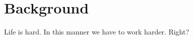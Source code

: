 \documentclass{article}
\begin{document}
\section{Background}
\label{sec:background}

Life is hard. In this manner we have to work harder. Right?
\end{document}
